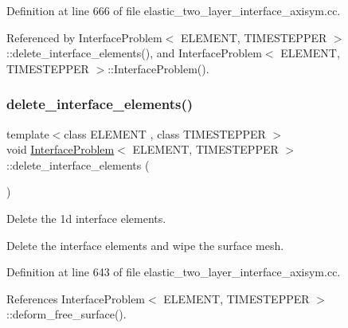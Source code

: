 Definition at line 666 of file elastic\+\_\+two\+\_\+layer\+\_\+interface\+\_\+axisym.\+cc.



Referenced by Interface\+Problem$<$ E\+L\+E\+M\+E\+N\+T, T\+I\+M\+E\+S\+T\+E\+P\+P\+E\+R $>$\+::delete\+\_\+interface\+\_\+elements(), and Interface\+Problem$<$ E\+L\+E\+M\+E\+N\+T, T\+I\+M\+E\+S\+T\+E\+P\+P\+E\+R $>$\+::\+Interface\+Problem().

\mbox{\label{classInterfaceProblem_ac2aaab086d9bbd3913ce8bc0d244413d}} 
\subsubsection{\texorpdfstring{delete\+\_\+interface\+\_\+elements()}{delete\_interface\_elements()}}
{\footnotesize\ttfamily template$<$class E\+L\+E\+M\+E\+NT , class T\+I\+M\+E\+S\+T\+E\+P\+P\+ER $>$ \\
void \hyperlink{classInterfaceProblem}{Interface\+Problem}$<$ E\+L\+E\+M\+E\+NT, T\+I\+M\+E\+S\+T\+E\+P\+P\+ER $>$\+::delete\+\_\+interface\+\_\+elements (\begin{DoxyParamCaption}{ }\end{DoxyParamCaption})\hspace{0.3cm}{\ttfamily [private]}}



Delete the 1d interface elements. 

Delete the interface elements and wipe the surface mesh. 

Definition at line 643 of file elastic\+\_\+two\+\_\+layer\+\_\+interface\+\_\+axisym.\+cc.



References Interface\+Problem$<$ E\+L\+E\+M\+E\+N\+T, T\+I\+M\+E\+S\+T\+E\+P\+P\+E\+R $>$\+::deform\+\_\+free\+\_\+surface().

\mbox{\label{classInterfaceProblem_a49714e35e94f7d2af0b6ddd22b851f52}} 
